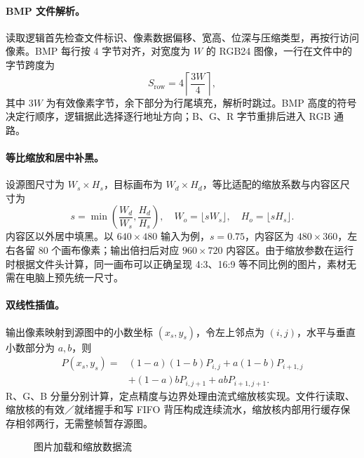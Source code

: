 \paragraph{BMP 文件解析。}读取逻辑首先检查文件标识、像素数据偏移、宽高、位深与压缩类型，再按行访问像素。BMP 每行按 4 字节对齐，对宽度为 $W$ 的 RGB24 图像，一行在文件中的字节跨度为
\begin{equation}
S_{\mathrm{row}}=4\left\lceil\frac{3W}{4}\right\rceil ,
\end{equation}
其中 $3W$ 为有效像素字节，余下部分为行尾填充，解析时跳过。BMP 高度的符号决定行顺序，逻辑据此选择逐行地址方向；B、G、R 字节重排后进入 RGB 通路。

\paragraph{等比缩放和居中补黑。}设源图尺寸为 $W_s\times H_s$，目标画布为 $W_d\times H_d$，等比适配的缩放系数与内容区尺寸为
\begin{equation}
s=\min\left(\frac{W_d}{W_s},\frac{H_d}{H_s}\right),\quad
W_o=\lfloor sW_s\rfloor,\quad H_o=\lfloor sH_s\rfloor .
\end{equation}
内容区以外居中填黑。以 $640\times480$ 输入为例，$s=0.75$，内容区为 $480\times360$，左右各留 80 个画布像素；输出倍扫后对应 $960\times720$ 内容区。由于缩放参数在运行时根据文件头计算，同一画布可以正确呈现 4:3、16:9 等不同比例的图片，素材无需在电脑上预先统一尺寸。

\paragraph{双线性插值。}输出像素映射到源图中的小数坐标 $(x_s,y_s)$，令左上邻点为 $(i,j)$，水平与垂直小数部分为 $a,b$，则
\begin{align}
P(x_s,y_s)={}&(1-a)(1-b)P_{i,j}+a(1-b)P_{i+1,j}\nonumber\\
 &+(1-a)bP_{i,j+1}+abP_{i+1,j+1}.
\end{align}
R、G、B 分量分别计算，定点精度与边界处理由流式缩放核实现。文件行读取、缩放核的有效／就绪握手和写 FIFO 背压构成连续流水，缩放核内部用行缓存保存相邻两行，无需整帧暂存源图。

\begin{figure}[H]\centering
{}
\caption{图片加载和缩放数据流}\label{fig:image-flow}
\end{figure}

